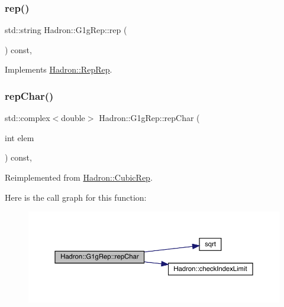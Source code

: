 \mbox{\label{structHadron_1_1G1gRep_ad03cbfd3310a65b26937f01ebaa044dd}} 
\subsubsection{\texorpdfstring{rep()}{rep()}\hspace{0.1cm}{\footnotesize\ttfamily [3/3]}}
{\footnotesize\ttfamily std\+::string Hadron\+::\+G1g\+Rep\+::rep (\begin{DoxyParamCaption}{ }\end{DoxyParamCaption}) const\hspace{0.3cm}{\ttfamily [inline]}, {\ttfamily [virtual]}}



Implements \mbox{\hyperlink{structHadron_1_1RepRep_ab3213025f6de249f7095892109575fde}{Hadron\+::\+Rep\+Rep}}.

\mbox{\label{structHadron_1_1G1gRep_aaf106033a828159337aed03c6489087f}} 
\subsubsection{\texorpdfstring{repChar()}{repChar()}\hspace{0.1cm}{\footnotesize\ttfamily [1/2]}}
{\footnotesize\ttfamily std\+::complex$<$double$>$ Hadron\+::\+G1g\+Rep\+::rep\+Char (\begin{DoxyParamCaption}\item[{int}]{elem }\end{DoxyParamCaption}) const\hspace{0.3cm}{\ttfamily [inline]}, {\ttfamily [virtual]}}



Reimplemented from \mbox{\hyperlink{structHadron_1_1CubicRep_af45227106e8e715e84b0af69cd3b36f8}{Hadron\+::\+Cubic\+Rep}}.

Here is the call graph for this function\+:
\nopagebreak
\begin{figure}[H]
\begin{center}
\leavevmode
\includegraphics[width=350pt]{d4/d3c/structHadron_1_1G1gRep_aaf106033a828159337aed03c6489087f_cgraph}
\end{center}
\end{figure}
\mbox{\label{structHadron_1_1G1gRep_aaf106033a828159337aed03c6489087f}} 
